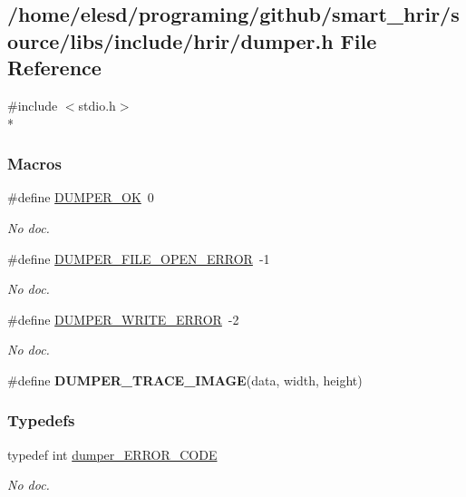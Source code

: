 \hypertarget{a00007}{\subsection{/home/elesd/programing/github/smart\-\_\-hrir/source/libs/include/hrir/dumper.h File Reference}
\label{a00007}
}
{\ttfamily \#include $<$stdio.\-h$>$}\\*
\subsubsection*{Macros}
\begin{DoxyCompactItemize}
\item 
\hypertarget{a00007_a963dec961ab29f9094b3df41dc59916c}{\#define \hyperlink{a00007_a963dec961ab29f9094b3df41dc59916c}{D\-U\-M\-P\-E\-R\-\_\-\-O\-K}~0}\label{a00007_a963dec961ab29f9094b3df41dc59916c}

\begin{DoxyCompactList}\small\item\em No doc. \end{DoxyCompactList}\item 
\hypertarget{a00007_aba952530ea6188d27c47d40d00493dd0}{\#define \hyperlink{a00007_aba952530ea6188d27c47d40d00493dd0}{D\-U\-M\-P\-E\-R\-\_\-\-F\-I\-L\-E\-\_\-\-O\-P\-E\-N\-\_\-\-E\-R\-R\-O\-R}~-\/1}\label{a00007_aba952530ea6188d27c47d40d00493dd0}

\begin{DoxyCompactList}\small\item\em No doc. \end{DoxyCompactList}\item 
\hypertarget{a00007_a86903e1939ee148d83c1784423c70f2c}{\#define \hyperlink{a00007_a86903e1939ee148d83c1784423c70f2c}{D\-U\-M\-P\-E\-R\-\_\-\-W\-R\-I\-T\-E\-\_\-\-E\-R\-R\-O\-R}~-\/2}\label{a00007_a86903e1939ee148d83c1784423c70f2c}

\begin{DoxyCompactList}\small\item\em No doc. \end{DoxyCompactList}\item 
\#define {\bfseries D\-U\-M\-P\-E\-R\-\_\-\-T\-R\-A\-C\-E\-\_\-\-I\-M\-A\-G\-E}(data, width, height)
\end{DoxyCompactItemize}
\subsubsection*{Typedefs}
\begin{DoxyCompactItemize}
\item 
\hypertarget{a00007_af6536bdd6757c29a21b351fe6f03e9ca}{typedef int \hyperlink{a00007_af6536bdd6757c29a21b351fe6f03e9ca}{dumper\-\_\-\-E\-R\-R\-O\-R\-\_\-\-C\-O\-D\-E}}\label{a00007_af6536bdd6757c29a21b351fe6f03e9ca}

\begin{DoxyCompactList}\small\item\em No doc. \end{DoxyCompactList}\end{DoxyCompactItemize}

